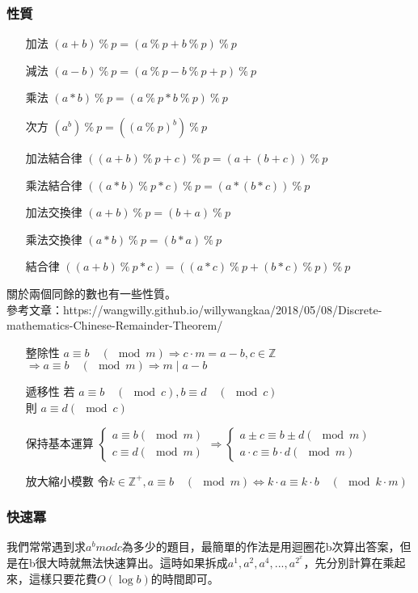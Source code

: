 \subsubsection{性質}
\begin{enumerate}
\item [加法] $(a+b)\ \%\ p= (a\ \%\ p +b\ \%\ p )\ \%\ p $
\item [減法] $(a-b)\ \%\ p= (a\ \%\ p -b\ \%\ p +p)\ \%\ p $
\item [乘法] $(a*b)\ \%\ p= (a\ \%\ p *b\ \%\ p )\ \%\ p $
\item [次方] $(a^b)\ \%\ p= ((a\ \%\ p )^b)\ \%\ p $
\item [加法結合律] $((a+b)\ \%\ p+c)\ \%\ p = (a+(b+c))\ \%\ p $
\item [乘法結合律] $((a*b)\ \%\ p*c)\ \%\ p = (a*(b*c))\ \%\ p $
\item [加法交換律] $(a+b)\ \%\ p=(b+a)\ \%\ p$
\item [乘法交換律] $(a*b)\ \%\ p=(b*a)\ \%\ p$
\item [結合律] $((a+b)\ \%\ p*c)= ((a*c)\ \%\ p +(b*c)\ \%\ p )\ \%\ p $
\end{enumerate}
關於兩個同餘的數也有一些性質。\\
參考文章：https://wangwilly.github.io/willywangkaa/2018/05/08/Discrete-mathematics-Chinese-Remainder-Theorem/
\begin{enumerate}
\item [整除性] $a\equiv b \quad (\mod m) \Rightarrow c \cdot m  = a - b , c \in \mathbb{Z}$\\ $\Rightarrow a \equiv b\quad ( \mod m ) \Rightarrow m \; | \; a-b$
\item [遞移性] 若 $a \equiv b \quad (\mod c) , b \equiv d \quad (\mod c)$\\ 則 $a \equiv d (\mod c)$
\item [保持基本運算] $\left \{ \begin{matrix} a \equiv b (\mod m)\\ c \equiv d (\mod m)\end{matrix}\right. \Rightarrow \left\{\begin{matrix}a \pm c \equiv b \pm d (\mod m)\\ a \cdot c \equiv b \cdot d (\mod m)\end{matrix}\right.$
\item [放大縮小模數] 令$k \in \mathbb{Z}^+ , a \equiv b \quad (\mod m) \Leftrightarrow k \cdot a \equiv k \cdot b \quad (\mod k \cdot m)$
\end{enumerate}
\subsubsection{快速冪}
我們常常遇到求$a^b mod c$為多少的題目，最簡單的作法是用迴圈花b次算出答案，但是在b很大時就無法快速算出。這時如果拆成$a^1,a^2,a^4,...,a^{2^x}$，先分別計算在乘起來，這樣只要花費$O(\log b)$的時間即可。

